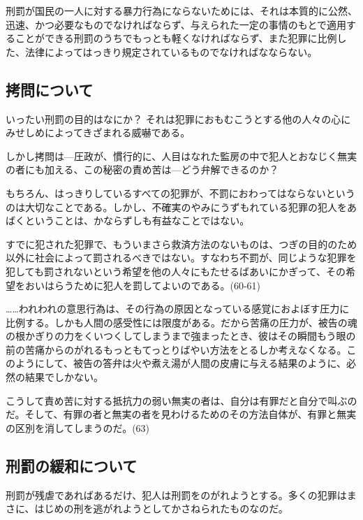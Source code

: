 刑罰が国民の一人に対する暴力行為にならないためには、それは本質的に公然、迅速、かつ必要なものでなければならず、与えられた一定の事情のもとで適用することができる刑罰のうちでもっとも軽くなければならず、また犯罪に比例した、法律によってはっきり規定されているものでなければなならない。

\subsection{拷問について}

いったい刑罰の目的はなにか？ それは犯罪におもむこうとする他の人々の心にみせしめによってきざまれる威嚇である。

しかし拷問は{\——}圧政が、慣行的に、人目はなれた監房の中で犯人とおなじく無実の者にも加える、この秘密の責め苦は{\——}どう弁解できるのか？

もちろん、はっきりしているすべての犯罪が、不罰におわってはならないというのは大切なことである。しかし、不確実のやみにうずもれている犯罪の犯人をあばくということは、かならずしも有益なことではない。

すでに犯された犯罪で、もういまさら救済方法のないものは、つぎの目的のため以外に社会によって罰されるべきではない。すなわち不罰が、同じような犯罪を犯しても罰されないという希望を他の人々にもたせるばあいにかぎって、その希望をおいはらうために犯人を罰してよいのである。(60-61)

……われわれの意思行為は、その行為の原因となっている感覚におよぼす圧力に比例する。しかも人間の感受性には限度がある。だから苦痛の圧力が、被告の魂の根かぎりの力をくいつくしてしまうまで強まったとき、彼はその瞬間もう眼の前の苦痛からのがれるもっともてっとりばやい方法をとるしか考えなくなる。このようにして、被告の答弁は火や煮え湯が人間の皮膚に与える結果のように、必然の結果でしかない。

こうして責め苦に対する抵抗力の弱い無実の者は、自分は有罪だと自分で叫ぶのだ。そして、有罪の者と無実の者を見わけるためのその方法自体が、有罪と無実の区別を消してしまうのだ。(63)

\subsection{刑罰の緩和について}


刑罰が残虐であればあるだけ、犯人は刑罰をのがれようとする。多くの犯罪はまさに、はじめの刑を逃がれようとしてかさねられたものなのだ。

